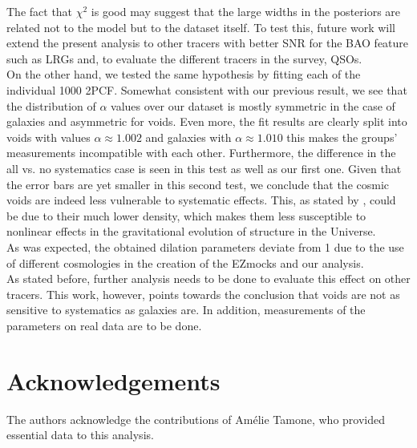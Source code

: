 \documentclass[fleqn, usenatbib]{mnras}
\begin{document}
The fact that $\chi^2$ is good may suggest that the large widths in the posteriors are related not to the model but to the dataset itself. To test this, future work will extend the present analysis to other tracers with better SNR for the BAO feature such as LRGs \citep[see][]{Liang2016} and, to evaluate the different tracers in the survey, QSOs.\\
On the other hand, we tested the same hypothesis by fitting each of the individual 1000 2PCF. Somewhat consistent with our previous result, we see that the distribution of $\alpha$ values over our dataset is mostly symmetric in the case of galaxies and asymmetric for voids. Even more, the fit results are clearly split into voids with values $\alpha\approx1.002$ and galaxies with $\alpha\approx1.010$ this makes the groups' measurements incompatible with each other. Furthermore, the difference in the all vs. no systematics case is seen in this test as well as our first one. Given that the error bars are yet smaller in this second test, we conclude that the cosmic voids are indeed less vulnerable to systematic effects. This, as stated by \citet{Zhao2019}, could be due to their much lower density, which makes them less susceptible to nonlinear effects in the gravitational evolution of structure in the Universe.\\
As was expected, the obtained dilation parameters deviate from 1 due to the use of different cosmologies in the creation of the EZmocks and our analysis.\\
As stated before, further analysis needs to be done to evaluate this effect on other tracers. This work, however, points towards the conclusion that voids are not as sensitive to systematics as galaxies are. In addition, measurements of the parameters on real data are to be done.

\section*{Acknowledgements}
The authors acknowledge the contributions of Am\'elie Tamone, who provided essential data to this analysis.






 
\end{document}
